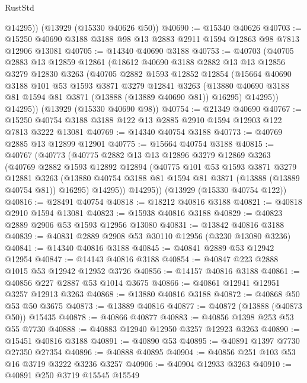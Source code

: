\begin{lexlean}{RustStd}
\begin{coremodule}
        @14295))
    (@13929 (@15330 @40626 @50))
@40690 := @15340 @40626
@40703 := @15250 @40690 @3188 @3188 @98 @13 @2883 @2911 @1594 @12863 @98 @7813 @12906 @13081
@40705 := @14340 @40690 @3188
@40753 := @40703
    (@40705
      @2883
      @13
      @12859
      @12861
      (@18612
        @40690
        @3188
        @2882
        @13
        @13
        @12856
        @3279
        @12830
        @3263
        (@40705
          @2882
          @1593
          @12852
          @12854
          (@15664
            @40690
            @3188
            @101
            @53
            @1593
            @3871
            @3279
            @12841
            @3263
            (@13880 @40690 @3188 @81 @1594 @81 @3871 (@13888 (@13889 @40690 @81)) @16295)
            @14295))
        @14295))
    (@13929 (@15330 @40690 @98))
@40754 := @21349 @40690
@40767 := @15250 @40754 @3188 @3188 @122 @13 @2885 @2910 @1594 @12903 @122 @7813 @3222 @13081
@40769 := @14340 @40754 @3188
@40773 := @40769 @2885 @13 @12899 @12901
@40775 := @15664 @40754 @3188
@40815 := @40767
    (@40773
      (@40775
        @2882
        @13
        @13
        @12896
        @3279
        @12869
        @3263
        (@40769
          @2882
          @1593
          @12892
          @12894
          (@40775
            @101
            @53
            @1593
            @3871
            @3279
            @12881
            @3263
            (@13880 @40754 @3188 @81 @1594 @81 @3871 (@13888 (@13889 @40754 @81)) @16295)
            @14295))
        @14295))
    (@13929 (@15330 @40754 @122))
@40816 := @28491 @40754
@40818 := @18212 @40816 @3188
@40821 := @40818 @2910 @1594 @13081
@40823 := @15938 @40816 @3188
@40829 := @40823 @2889 @2906 @53 @1593 @12956 @13080
@40831 := @13842 @40816 @3188
@40839 := @40831 @2889 @2908 @53 @30110 @12956 (@3230 @13080 @3236)
@40841 := @14340 @40816 @3188
@40845 := @40841 @2889 @53 @12942 @12954
@40847 := @14143 @40816 @3188
@40854 := @40847 @223 @2888 @1015 @53 @12942 @12952 @3726
@40856 := @14157 @40816 @3188
@40861 := @40856 @227 @2887 @53 @1014 @3675
@40866 := @40861 @12941 @12951 @3257 @12913 @3263
@40868 := @13880 @40816 @3188
@40872 := @40868 @50 @53 @50 @3675
@40873 := @13889 @40816
@40877 := @40872 (@13888 (@40873 @50)) @15435
@40878 := @40866 @40877
@40883 := @40856 @1398 @253 @53 @55 @7730
@40888 := @40883 @12940 @12950 @3257 @12923 @3263
@40890 := @15451 @40816 @3188
@40891 := @40890 @53
@40895 := @40891 @1397 @7730 @27350 @27354
@40896 := @40888 @40895
@40904 := @40856 @251 @103 @53 @16 @3719 @3222 @3236 @3257
@40906 := @40904 @12933 @3263
@40910 := @40891 @250 @3719 @15545 @15549

\end{coremodule}
\end{lexlean}
